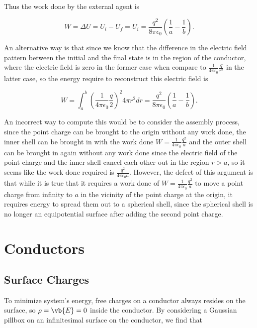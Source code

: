 \documentclass[english,a4paper,12pt]{report}
\begin{document}
{Thus the work done by the external agent is

\begin{equation}
    W = \Delta U = U_{i} - U_{f} = U_{i} = \frac{q^2}{8\pi \epsilon_0} (\frac{1}{a} - \frac{1}{b} ) .
\end{equation}

An alternative way is that since we know that the difference in the electric field pattern between the initial and the final state is in the region of the conductor, where the electric field is zero in the former case when compare to \(\frac{1}{4\pi\epsilon_0} \frac{q}{r^2} \) in the latter case, so the energy require to reconstruct this electric field is 

\begin{equation}
    W = \int_{a}^{b} (\frac{1}{4\pi\epsilon_0} \frac{q}{2} )^2 4\pi r^2dr =   \frac{q^2}{8\pi \epsilon_0} (\frac{1}{a} - \frac{1}{b} ) .
\end{equation}

An incorrect way to compute this would be to consider the assembly process, since the point charge can be brought to the origin without any work done, the inner shell can be brought in with the work done \(\displaystyle W = \frac{1}{4\pi\epsilon_0} \frac{q^2}{a} \) and the outer shell can be brought in again without any work done since the electric field of the point charge and the inner shell cancel each other out in the region \(r > a\), so it seems like the work done required is \(\displaystyle \frac{q^2}{4\pi \epsilon_0 a} \). However, the defect of this argument is that while it is true that it requires a work done of \(\displaystyle W = \frac{1}{4\pi\epsilon_0} \frac{q^2}{a} \) to move a point charge from infinity to \(a\) in the vicinity of the point charge at the origin, it requires energy to spread them out to a spherical shell, since the spherical shell is no longer an equipotential surface after adding the second point charge.}


\section{Conductors}

\subsection{Surface Charges}

To minimize system's energy, free charges on a conductor always resides on the surface, so \(\rho  = \vb{E}  = 0 \) inside the conductor. By considering a Gaussian pillbox on an infinitesimal surface on the conductor, we find that 
\end{document}
